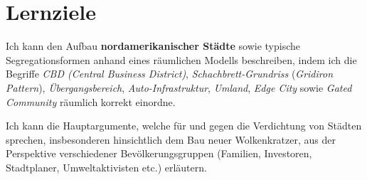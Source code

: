 \section{Lernziele}
\begin{todolist}
\item Ich kann den Aufbau \textbf{nordamerikanischer Städte} sowie typische Segregationsformen anhand eines räumlichen Modells beschreiben, indem ich die Begriffe \textit{CBD (Central Business District)}, \textit{Schachbrett-Grundriss} (\textit{Gridiron Pattern}), \textit{Übergangsbereich}, \textit{Auto-Infrastruktur}, \textit{Umland}, \textit{Edge City} sowie \textit{Gated Community} räumlich korrekt einordne.
\item Ich kann die Hauptargumente, welche für und gegen die Verdichtung von Städten sprechen, insbesonderen hinsichtlich dem Bau neuer Wolkenkratzer, aus der Perspektive verschiedener Bevölkerungsgruppen (Familien, Investoren, Stadtplaner, Umweltaktivisten etc.) erläutern.
\end{todolist}

